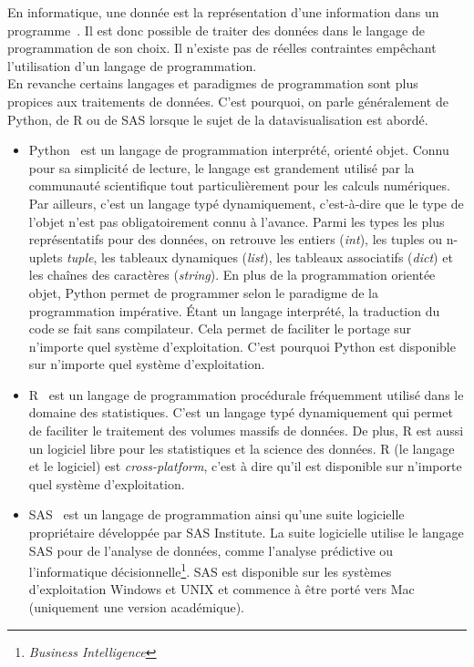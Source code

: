 \guillemotleft En informatique, une donnée est la représentation d'une information dans un programme\guillemotright ~\textcite{Wiki}. Il est donc possible de traiter des données dans le langage de programmation de son choix. Il n'existe pas de réelles contraintes empêchant l'utilisation d'un langage de programmation.\\

En revanche certains langages et paradigmes de programmation sont plus propices aux traitements de données. C'est pourquoi, on parle généralement de Python, de R ou de SAS lorsque le sujet de la datavisualisation est abordé.
\begin{itemize}
\item Python~\cite{Python} est un langage de programmation interprété, orienté objet. Connu pour sa simplicité de lecture, le langage est grandement utilisé par la communauté scientifique tout particulièrement pour les calculs numériques. Par ailleurs, c'est un langage typé dynamiquement, c'est-à-dire que le type de l'objet n'est pas obligatoirement connu à l'avance. Parmi les types les plus représentatifs pour des données, on retrouve les entiers (\textit{int}), les tuples ou n-uplets \textit{tuple}, les tableaux dynamiques (\textit{list}), les tableaux associatifs (\textit{dict}) et les chaînes des caractères (\textit{string}). En plus de la programmation orientée objet, Python permet de programmer selon le paradigme de la programmation impérative. Étant un langage interprété, la traduction du code se fait sans compilateur. Cela permet de faciliter le portage sur n'importe quel système d'exploitation. C'est pourquoi Python est disponible sur n'importe quel système d'exploitation.
\item R~\cite{R} est un langage de programmation procédurale fréquemment utilisé dans le domaine des statistiques. C'est un langage typé dynamiquement qui permet de faciliter le traitement des volumes massifs de données. De plus, R est aussi un logiciel libre pour les statistiques et la science des données. R (le langage et le logiciel) est \textit{cross-platform}, c'est à dire qu'il est disponible sur n'importe quel système d'exploitation.
\item SAS~\cite{SAS} est un langage de programmation ainsi qu'une suite logicielle propriétaire développée par SAS Institute. La suite logicielle utilise le langage SAS pour de l'analyse de données, comme l'analyse prédictive ou l'informatique décisionnelle\footnote{\textit{Business Intelligence}}. SAS est disponible sur les systèmes d'exploitation Windows et UNIX et commence à être porté vers Mac (uniquement une version académique).
\end{itemize}